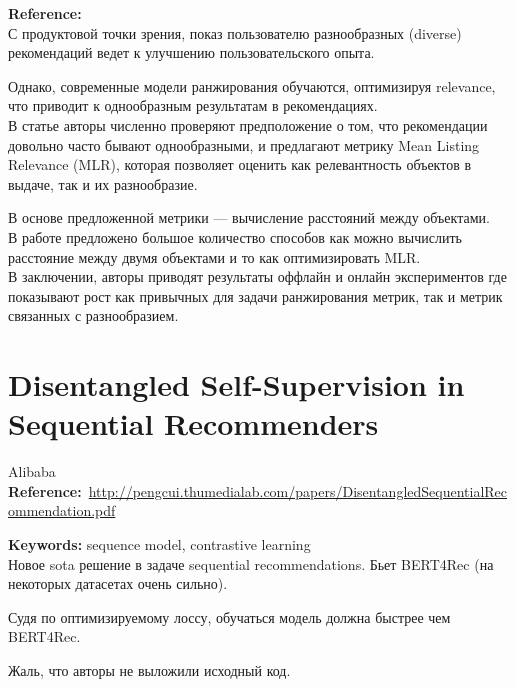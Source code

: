 \begin{bibunit}[plainnat]
\textbf{Reference:}~\cite{abdool2020managing} \\

С продуктовой точки зрения, показ пользователю разнообразных (diverse) рекомендаций ведет к улучшению пользовательского опыта.

Однако, современные модели ранжирования обучаются, оптимизируя relevance, что приводит к однообразным результатам в рекомендациях. \\

В статье авторы численно проверяют предположение о том, что рекомендации довольно часто бывают однообразными, и предлагают метрику Mean Listing Relevance (MLR), которая позволяет оценить как релевантность объектов в выдаче, так и их разнообразие. 

В основе предложенной метрики --- вычисление расстояний между объектами. \\

В работе предложено большое количество способов как можно вычислить расстояние между двумя объектами и то как оптимизировать MLR. \\

В заключении, авторы приводят результаты оффлайн и онлайн экспериментов где показывают рост как привычных для задачи ранжирования метрик, так и метрик связанных с разнообразием.

\section*{Disentangled Self-Supervision in Sequential Recommenders}

Alibaba \\

\textbf{Reference:}~\url{http://pengcui.thumedialab.com/papers/DisentangledSequentialRecommendation.pdf}

\textbf{Keywords:} sequence model, contrastive learning \\

Новое sota решение в задаче sequential recommendations. Бьет BERT4Rec (на некоторых датасетах очень сильно).

Судя по оптимизируемому лоссу, обучаться модель должна быстрее чем BERT4Rec.

Жаль, что авторы не выложили исходный код.

\end{bibunit}

